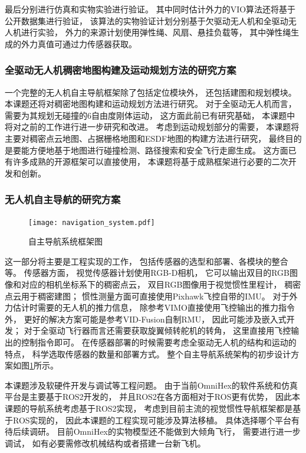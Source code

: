 最后分别进行仿真和实物实验进行验证。
其中同时估计外力的VIO算法还将基于公开数据集进行验证，
该算法的实物验证计划分别基于欠驱动无人机和全驱动无人机进行实验，
外力的来源计划使用弹性绳、风扇、悬挂负载等，
其中弹性绳生成的外力真值可通过力传感器获取。

\subsubsection{全驱动无人机稠密地图构建及运动规划方法的研究方案}
一个完整的无人机自主导航框架除了包括定位模块外，
还包括建图和规划模块。
本课题还将对稠密地图构建和运动规划方法进行研究。
对于全驱动无人机而言，
需要为其规划无碰撞的6自由度刚体运动，
这方面此前已有研究基础，
本课题中将对之前的工作进行进一步研究和改进。
考虑到运动规划部分的需要，
本课题将主要对稠密点云地图、占据栅格地图和ESDF地图的构建方法进行研究，
最终目的是要能方便地基于地图进行碰撞检测、路径搜索和安全飞行走廊生成。
这方面已有许多成熟的开源框架可以直接使用，
本课题将基于成熟框架进行必要的二次开发和创新。

\subsubsection{无人机自主导航的研究方案}

\begin{figure}[ht]
    \centering
    \texttt{[image: navigation\_system.pdf]}
    \caption{自主导航系统框架图}
    \label{fig:navigation_system}
\end{figure}

这一部分将主要是工程实现的工作，
包括传感器的选型和部署、各模块的整合等。
传感器方面，
视觉传感器计划使用RGB-D相机， 
它可以输出双目的RGB图像和对应的相机坐标系下的稠密点云，
双目RGB图像用于视觉惯性里程计，
稠密点云用于稠密建图；
惯性测量方面可直接使用Pixhawk飞控自带的IMU。
对于外力估计时需要的无人机的推力信息，
除参考VIMO直接使用飞控输出的推力指令外，
更好的解决方案可能是参考VID-Fusion自制RMU，
因此可能涉及嵌入式开发；
对于全驱动飞行器而言还需要获取旋翼倾转舵机的转角，
这里直接用飞控输出的控制指令即可。
在传感器部署的时候需要考虑全驱动无人机的结构和运动的特点，
科学选取传感器的数量和部署方式。
整个自主导航系统架构的初步设计方案如图\ref{fig:navigation_system}所示。

本课题涉及软硬件开发与调试等工程问题。
由于当前OmniHex的软件系统和仿真平台是主要基于ROS2开发的，
并且ROS2在各方面相对于ROS更有优势，
因此本课题的导航系统考虑基于ROS2实现，
考虑到目前主流的视觉惯性导航框架都是基于ROS实现的，
因此本课题的工程实现可能涉及算法移植。
具体选择哪个平台有待后续调研。
目前OmniHex的实物模型还不能做到大倾角飞行，
需要进行进一步调试，
如有必要需修改机械结构或者搭建一台新飞机。


